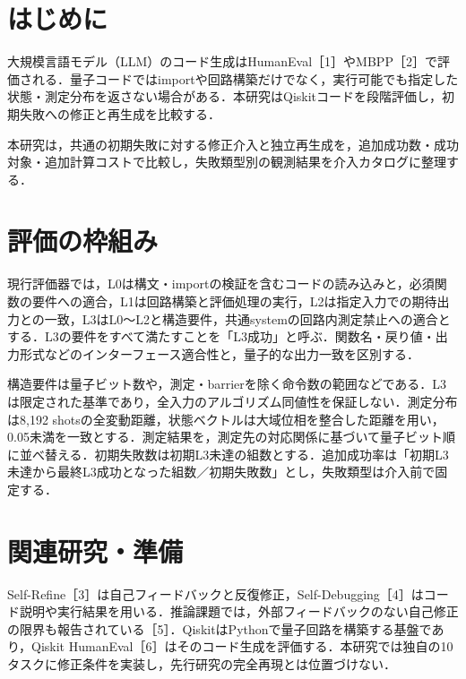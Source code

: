 \documentclass[a4paper,10pt,twocolumn]{extarticle}
\begin{document}

\section{はじめに}
大規模言語モデル（LLM）のコード生成はHumanEval［1］やMBPP［2］で評価される．量子コードではimportや回路構築だけでなく，実行可能でも指定した状態・測定分布を返さない場合がある．本研究はQiskitコードを段階評価し，初期失敗への修正と再生成を比較する．

本研究は，共通の初期失敗に対する修正介入と独立再生成を，追加成功数・成功対象・追加計算コストで比較し，失敗類型別の観測結果を介入カタログに整理する．

\section{評価の枠組み}
現行評価器では，L0は構文・importの検証を含むコードの読み込みと，必須関数の要件への適合，L1は回路構築と評価処理の実行，L2は指定入力での期待出力との一致，L3はL0〜L2と構造要件，共通systemの回路内測定禁止への適合とする．L3の要件をすべて満たすことを「L3成功」と呼ぶ．関数名・戻り値・出力形式などのインターフェース適合性と，量子的な出力一致を区別する．

構造要件は量子ビット数や，測定・barrierを除く命令数の範囲などである．L3は限定された基準であり，全入力のアルゴリズム同値性を保証しない．測定分布は8,192 shotsの全変動距離，状態ベクトルは大域位相を整合した距離を用い，0.05未満を一致とする．測定結果を，測定先の対応関係に基づいて量子ビット順に並べ替える．初期失敗数は初期L3未達の組数とする．追加成功率は「初期L3未達から最終L3成功となった組数／初期失敗数」とし，失敗類型は介入前で固定する．

\section{関連研究・準備}
Self-Refine［3］は自己フィードバックと反復修正，Self-Debugging［4］はコード説明や実行結果を用いる．推論課題では，外部フィードバックのない自己修正の限界も報告されている［5］．QiskitはPythonで量子回路を構築する基盤であり，Qiskit HumanEval［6］はそのコード生成を評価する．本研究では独自の10タスクに修正条件を実装し，先行研究の完全再現とは位置づけない．
\end{document}
